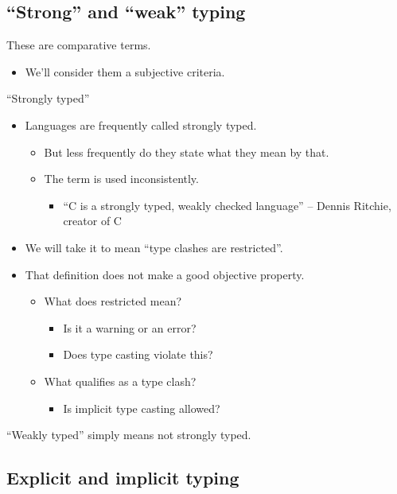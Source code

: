 \documentclass[11pt]{article}
\theoremstyle{definition}
\begin{document}
\subsection{“Strong” and “weak” typing}
\label{sec:org03b9cdc}

These are comparative terms.
\begin{itemize}
\item We'll consider them a subjective criteria.
\end{itemize}

“Strongly typed”
\begin{itemize}
\item Languages are frequently called strongly typed.
\begin{itemize}
\item But less frequently do they state what they mean by that.
\item The term is used inconsistently.
\begin{itemize}
\item “C is a strongly typed, weakly checked language”
– Dennis Ritchie, creator of C
\end{itemize}
\end{itemize}
\item We will take it to mean “type clashes are restricted”.
\item That definition does not make a good objective property.
\begin{itemize}
\item What does restricted mean?
\begin{itemize}
\item Is it a warning or an error?
\item Does type casting violate this?
\end{itemize}
\item What qualifies as a type clash?
\begin{itemize}
\item Is implicit type casting allowed?
\end{itemize}
\end{itemize}
\end{itemize}

“Weakly typed” simply means not strongly typed.

\subsection{Explicit and implicit typing}
\label{sec:org3318602}
\end{document}
